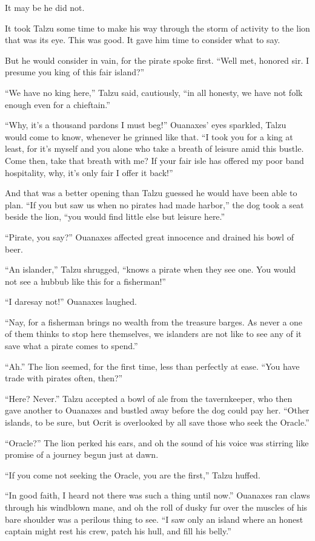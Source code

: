 It may be he did not.

It took Talzu some time to make his way through the storm of activity to the lion that was its eye. This was good. It gave him time to consider what to say.

But he would consider in vain, for the pirate spoke first. ``Well met, honored sir. I presume you king of this fair island?''

``We have no king here,'' Talzu said, cautiously, ``in all honesty, we have not folk enough even for a chieftain.''

``Why, it's a thousand pardons I must beg!'' Ouanaxes' eyes sparkled, Talzu would come to know, whenever he grinned like that. ``I took you for a king at least, for it's myself and you alone who take a breath of leisure amid this bustle. Come then, take that breath with me? If your fair isle has offered my poor band hospitality, why, it's only fair I offer it back!''

And that was a better opening than Talzu guessed he would have been able to plan. ``If you but saw us when no pirates had made harbor,'' the dog took a seat beside the lion, ``you would find little else but leisure here.''

``Pirate, you say?'' Ouanaxes affected great innocence and drained his bowl of beer.

``An islander,'' Talzu shrugged, ``knows a pirate when they see one. You would not see a hubbub like this for a fisherman!''

``I daresay not!'' Ouanaxes laughed.

``Nay, for a fisherman brings no wealth from the treasure barges. As never a one of them thinks to stop here themselves, we islanders are not like to see any of it save what a pirate comes to spend.''

``Ah.'' The lion seemed, for the first time, less than perfectly at ease. ``You have trade with pirates often, then?''

``Here? Never.'' Talzu accepted a bowl of ale from the tavernkeeper, who then gave another to Ouanaxes and bustled away before the dog could pay her. ``Other islands, to be sure, but Ocrit is overlooked by all save those who seek the Oracle.''

``Oracle?'' The lion perked his ears, and oh the sound of his voice was stirring like promise of a journey begun just at dawn.

``If you come not seeking the Oracle, you are the first,'' Talzu huffed.

``In good faith, I heard not there was such a thing until now.'' Ouanaxes ran claws through his windblown mane, and oh the roll of dusky fur over the muscles of his bare shoulder was a perilous thing to see. ``I saw only an island where an honest captain might rest his crew, patch his hull, and fill his belly.''

